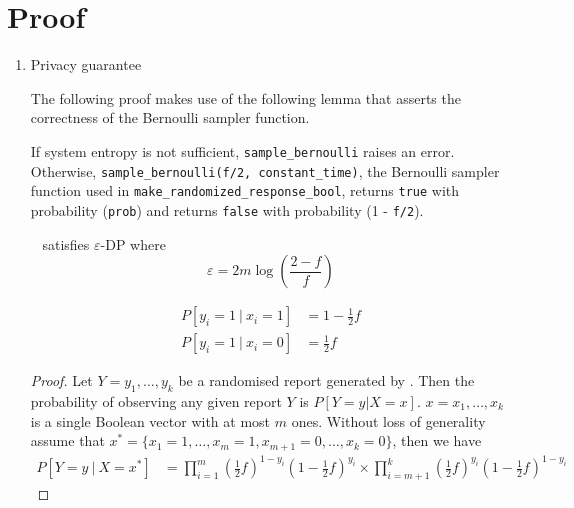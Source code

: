 \documentclass{article}
\begin{document}
\section{Proof}
\begin{enumerate}
	\item Privacy guarantee
\begin{tcolorbox}
\begin{note}
The following proof makes use of the following lemma that asserts the correctness of the Bernoulli sampler function.
    \begin{lemma}
    If system entropy is not sufficient, \texttt{sample\_bernoulli} raises an error. 
    Otherwise, \texttt{sample\_bernoulli(f/2, constant\_time)}, the Bernoulli sampler function used in \texttt{make\_randomized\_response\_bool}, 
    returns \texttt{true} with probability (\texttt{prob}) and returns  \texttt{false} with probability (1 - \texttt{f/2}).
    \end{lemma}
\end{note}
\end{tcolorbox}
\begin{theorem}~\cite{rappor}
\label{thm:privacy-parameter}
	 satisfies $\varepsilon$-DP where 
	\begin{equation*}
		\varepsilon = 2m\log\left(\frac{2-f}{f}\right)
	\end{equation*}
\end{theorem}
\begin{lemma}
	\begin{align}
		P[y_i = 1~|~x_i=1] &= 1 - \frac{1}{2}f\\
		P[y_i = 1~|~x_i=0] &=\frac{1}{2}f
	\end{align}
\end{lemma}
\begin{proof}
	Let $Y=y_1,\ldots,y_k$ be a randomised report generated by . Then the probability of observing any given report $Y$ is $P[Y=y | X=x]$. $x=x_1,\ldots,x_k$ is a single Boolean vector with at most $m$ ones. 
	Without loss of generality assume that $x^*=\{x_1=1,\ldots,x_m=1,x_{m+1}=0,\ldots,x_k=0\}$, then we have
	\begin{align*}
		P[Y=y~|~X=x^*] &=%
			\prod\limits_{i=1}^m \left(\frac{1}{2}f\right)^{1-y_i}\left(1-\frac{1}{2}f\right)^{y_i}%
			\times \prod\limits_{i=m+1}^k\left(\frac{1}{2}f\right)^{y_i} \left(1-\frac{1}{2}f\right)^{1-y_i}
	\end{align*}

\end{proof}
\end{enumerate}
\end{document}
